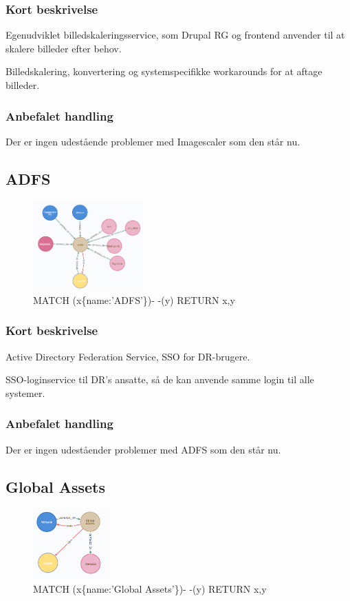 \documentclass{article}
\begin{document}
\subsubsection*{Kort beskrivelse}
Egenudviklet billedskaleringsservice, som Drupal RG og frontend anvender til at skalere billeder efter behov.	

Billedskalering, konvertering og systemspecifikke workarounds for at aftage billeder.
\subsubsection*{Anbefalet handling}
Der er ingen udestående problemer med Imagescaler som den står nu. 


\subsection{ADFS}
\begin{figure}[h]
\includegraphics[width=120pt]{ADFS.PNG}
\caption{MATCH (x\{name:'ADFS'\})- -(y) RETURN x,y}
\end{figure}
\subsubsection*{Kort beskrivelse}
Active Directory Federation Service, SSO for DR-brugere.

SSO-loginservice til DR's ansatte, så de kan anvende samme login til alle systemer.
\subsubsection*{Anbefalet handling}
Der er ingen udeståender problemer med ADFS som den står nu.


\subsection{Global Assets}
\begin{figure}[h]
\includegraphics[width=80pt]{GlobalAssets.PNG}
\caption{MATCH (x\{name:'Global Assets'\})- -(y) RETURN x,y}
\end{figure}
\end{document}

